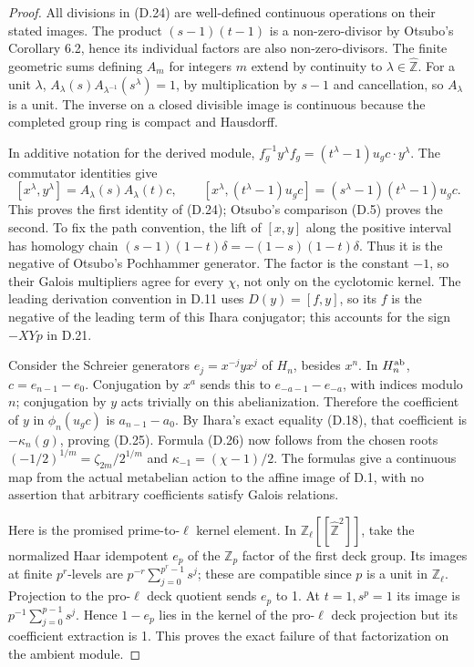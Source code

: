 \begin{proof}
All divisions in (D.24) are well-defined continuous operations on their stated images. The product $(s-1)(t-1)$ is a non-zero-divisor by Otsubo's Corollary 6.2, hence its individual factors are also non-zero-divisors. The finite geometric sums defining $A_m$ for integers $m$ extend by continuity to $\lambda\in\widehat{\mathbb Z}$. For a unit $\lambda$,
$A_\lambda(s)A_{\lambda^{-1}}(s^\lambda)=1$, by multiplication by $s-1$ and cancellation, so $A_\lambda$ is a unit. The inverse on a closed divisible image is continuous because the completed group ring is compact and Hausdorff.

In additive notation for the derived module,
$f_g^{-1}y^\lambda f_g=(t^\lambda-1)u_gc\cdot y^\lambda$.
The commutator identities give
\[
 [x^\lambda,y^\lambda]=A_\lambda(s)A_\lambda(t)c,
 \qquad
 [x^\lambda,(t^\lambda-1)u_gc]=(s^\lambda-1)(t^\lambda-1)u_gc.
\]
This proves the first identity of (D.24); Otsubo's comparison (D.5) proves the second. To fix the path convention, the lift of $[x,y]$ along the positive interval has homology chain
$(s-1)(1-t)\delta=-(1-s)(1-t)\delta$. Thus it is the negative of Otsubo's Pochhammer generator. The factor is the constant $-1$, so their Galois multipliers agree for every $\chi$, not only on the cyclotomic kernel. The leading derivation convention in D.11 uses $D(y)=[f,y]$, so its $f$ is the negative of the leading term of this Ihara conjugator; this accounts for the sign $-XYp$ in D.21.

Consider the Schreier generators $e_j=x^{-j}yx^j$ of $H_n$, besides $x^n$. In $H_n^{\rm ab}$,
$c=e_{n-1}-e_0$. Conjugation by $x^a$ sends this to
$e_{-a-1}-e_{-a}$, with indices modulo $n$; conjugation by $y$ acts trivially on this abelianization. Therefore the coefficient of $y$ in $\phi_n(u_gc)$ is $a_{n-1}-a_0$.
By Ihara's exact equality (D.18), that coefficient is $-\kappa_n(g)$, proving (D.25). Formula (D.26) now follows from the chosen roots
$(-1/2)^{1/m}=\zeta_{2m}/2^{1/m}$ and
$\kappa_{-1}=(\chi-1)/2$. The formulas give a continuous map from the actual metabelian action to the affine image of D.1, with no assertion that arbitrary coefficients satisfy Galois relations.

Here is the promised prime-to-$\ell$ kernel element. In
$\mathbb Z_\ell[[\widehat{\mathbb Z}^2]]$, take the normalized Haar idempotent $e_p$ of the $\mathbb Z_p$ factor of the first deck group. Its images at finite $p^r$-levels are
$p^{-r}\sum_{j=0}^{p^r-1}s^j$; these are compatible since $p$ is a unit in $\mathbb Z_\ell$. Projection to the pro-$\ell$ deck quotient sends $e_p$ to 1. At $t=1,s^p=1$ its image is $p^{-1}\sum_{j=0}^{p-1}s^j$. Hence $1-e_p$ lies in the kernel of the pro-$\ell$ deck projection but its coefficient extraction is 1. This proves the exact failure of that factorization on the ambient module.


\end{proof}
